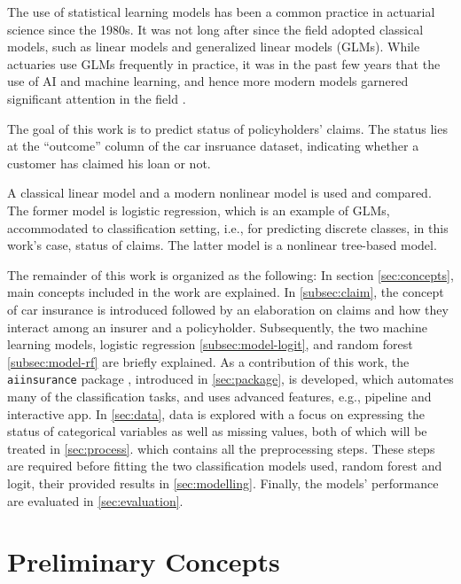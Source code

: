 \documentclass{article}
\begin{document}
The use of statistical learning models has been a common practice in
actuarial science since the 1980s. It was not long after since the field
adopted classical models, such as linear models and generalized linear
models (GLMs). While actuaries use GLMs frequently in practice, it was
in the past few years that the use of AI and machine learning, and hence
more modern models garnered significant attention in the field
\cite{rev1}.

The goal of this work is to predict status of policyholders' claims. The
status lies at the ``outcome'' column of the car insruance dataset,
indicating whether a customer has claimed his loan or not.

A classical linear model and a modern nonlinear model is used and
compared. The former model is logistic regression, which is an example
of GLMs, accommodated to classification setting, i.e., for predicting
discrete classes, in this work's case, status of claims. The latter
model is a nonlinear tree-based model.

The remainder of this work is organized as the following: In section
\ref{sec:concepts}, main concepts included in the work are explained. In
\ref{subsec:claim}, the concept of car insurance is introduced followed
by an elaboration on claims and how they interact among an insurer and a
policyholder. Subsequently, the two machine learning models, logistic
regression \ref{subsec:model-logit}, and random forest
\ref{subsec:model-rf} are briefly explained. As a contribution of this
work, the \texttt{aiinsurance} package \cite{package}, introduced in
\ref{sec:package}, is developed, which automates many of the
classification tasks, and uses advanced features, e.g., pipeline and
interactive app. In \ref{sec:data}, data is explored with a focus on
expressing the status of categorical variables as well as missing
values, both of which will be treated in \ref{sec:process}. which
contains all the preprocessing steps. These steps are required before
fitting the two classification models used, random forest and logit,
their provided results in \ref{sec:modelling}. Finally, the models'
performance are evaluated in \ref{sec:evaluation}.

\newpage

\hypertarget{preliminary-concepts}{%
\section{\texorpdfstring{Preliminary Concepts
\label{sec:concepts}}{Preliminary Concepts }}\label{preliminary-concepts}}
\end{document}
